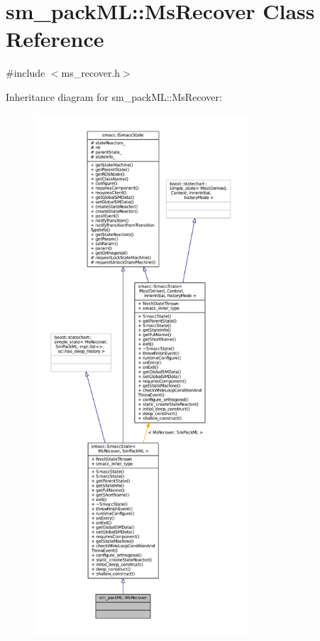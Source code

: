 \hypertarget{classsm__packML_1_1MsRecover}{}\section{sm\+\_\+pack\+ML\+:\+:Ms\+Recover Class Reference}
\label{classsm__packML_1_1MsRecover}


{\ttfamily \#include $<$ms\+\_\+recover.\+h$>$}



Inheritance diagram for sm\+\_\+pack\+ML\+:\+:Ms\+Recover\+:
\nopagebreak
\begin{figure}[H]
\begin{center}
\leavevmode
\includegraphics[height=550pt]{classsm__packML_1_1MsRecover__inherit__graph}
\end{center}
\end{figure}


